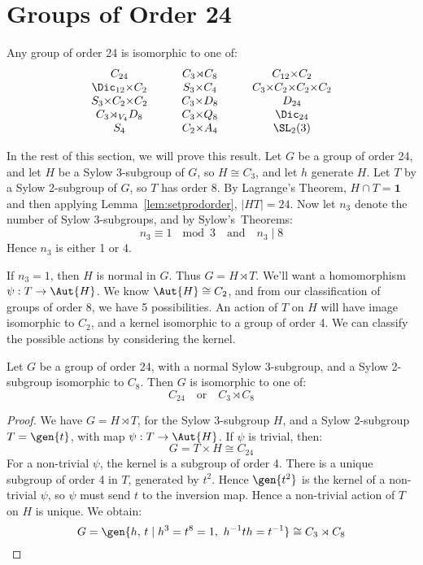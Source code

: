 \section{Groups of Order 24}
\begin{theorem}\label{thm:24}
    Any group of order 24 is isomorphic to one of:
    \begin{displaymath}
    \begin{array}{c@{\hskip 3em}c@{\hskip 3em}c}
        C_{24} & C_3{\rtimes}C_8 & C_{12}{\times}C_2 \\
        \Dic_{12}{\times}C_2 & S_3{\times}C_4 & C_3{\times}C_2{\times}C_2{\times}C_2 \\
        S_3{\times}C_2{\times}C_2 & C_3{\times}D_8 & D_{24} \\
        C_3{\rtimes_{V_4}}D_8 & C_3{\times}Q_8 & \Dic_{24} \\
        S_4 & C_2{\times}A_4 & \SL_2(3)
    \end{array}
    \end{displaymath}
\end{theorem}

In the rest of this section, we will prove this result.
Let \(G\) be a group of order 24, and let \(H\) be a Sylow 3-subgroup of \(G\), so \(H \cong C_3\), and let \(h\)
generate \(H\).
Let \(T\) by a Sylow 2-subgroup of \(G\), so \(T\) has order 8.
By Lagrange's Theorem, \(H \cap T = \bm{1}\) and then applying Lemma~\ref{lem:setprodorder}, \(|HT| = 24\).
Now let \(n_3\) denote the number of Sylow 3-subgroups, and by Sylow's~Theorems:
\[n_3 \equiv 1\ \mod{3} \quad \text{and} \quad n_3 \mid 8\]
Hence \(n_3\) is either 1 or 4.

If \(n_3 = 1\), then \(H\) is normal in \(G\).
Thus \(G = H \rtimes T\).
We'll want a homomorphism \(\psi: T \to \Aut{H}\).
We know \(\Aut{H} \cong C_2\), and from our classification of groups of order 8, we have 5 possibilities.
An action of \(T\) on \(H\) will have image isomorphic to \(C_2\), and a kernel isomorphic to a group of order 4.
We can classify the possible actions by considering the kernel.

\begin{lemma}\label{lem:24_first}
    Let \(G\) be a group of order 24, with a normal Sylow 3-subgroup, and a Sylow 2-subgroup isomorphic to \(C_8\).
    Then \(G\) is isomorphic to one of:
    \[
        C_{24} \quad \text{or} \quad%
        C_3 \rtimes C_{8}
    \]
\end{lemma}

\begin{proof}
    We have \(G = H \rtimes T\), for the Sylow 3-subgroup \(H\), and a Sylow 2-subgroup \(T = \gen{t}\), with map
    \(\psi:T \to \Aut{H}\).
    If \(\psi\) is trivial, then:
    \[G = T \times H \cong C_{24}\]
    For a non-trivial \(\psi\), the kernel is a subgroup of order 4.
    There is a unique subgroup of order 4 in \(T\), generated by \(t^2\).
    Hence \(\gen{t^2}\) is the kernel of a non-trivial \(\psi\), so \(\psi\) must send \(t\) to the inversion map.
    Hence a non-trivial action of \(T\) on \(H\) is unique.
    We obtain:
    \[G = \gen{h,\,t \mid h^3 = t^8 = 1,\ h^{-1}th = t^{-1}} \cong C_3 \rtimes C_8\]
\end{proof}

